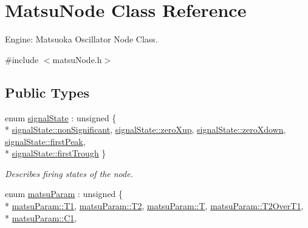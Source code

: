 \hypertarget{classMatsuNode}{}\section{Matsu\+Node Class Reference}
\label{classMatsuNode}


Engine\+: Matsuoka Oscillator Node Class.  




{\ttfamily \#include $<$matsu\+Node.\+h$>$}

\subsection*{Public Types}
\begin{DoxyCompactItemize}
\item 
enum \hyperlink{classMatsuNode_abd587a4a72c6774f689d21c78a8bc239}{signal\+State} \+: unsigned \{ \\*
\hyperlink{classMatsuNode_abd587a4a72c6774f689d21c78a8bc239a0bb1b43452dec8bd11b5e9890a7f7450}{signal\+State\+::non\+Significant}, 
\hyperlink{classMatsuNode_abd587a4a72c6774f689d21c78a8bc239a3f079b68569f500bc365cf6513c49faf}{signal\+State\+::zero\+Xup}, 
\hyperlink{classMatsuNode_abd587a4a72c6774f689d21c78a8bc239a407fa5b9f845d5588e6c327b02619574}{signal\+State\+::zero\+Xdown}, 
\hyperlink{classMatsuNode_abd587a4a72c6774f689d21c78a8bc239a29d72117a1b778320c35281a36df8c3b}{signal\+State\+::first\+Peak}, 
\\*
\hyperlink{classMatsuNode_abd587a4a72c6774f689d21c78a8bc239a9c831b3d9b2ac846c1900fca753db49a}{signal\+State\+::first\+Trough}
 \}\begin{DoxyCompactList}\small\item\em Describes firing states of the node. \end{DoxyCompactList}
\item 
enum \hyperlink{classMatsuNode_aed801e1d0363292efc99bb02f1911386}{matsu\+Param} \+: unsigned \{ \\*
\hyperlink{classMatsuNode_aed801e1d0363292efc99bb02f1911386ace499dea30cfce118f4fe85da0227e83}{matsu\+Param\+::\+T1}, 
\hyperlink{classMatsuNode_aed801e1d0363292efc99bb02f1911386a71d2c46af01feeea54a0f541243e297b}{matsu\+Param\+::\+T2}, 
\hyperlink{classMatsuNode_aed801e1d0363292efc99bb02f1911386ab9ece18c950afbfa6b0fdbfa4ff731d3}{matsu\+Param\+::T}, 
\hyperlink{classMatsuNode_aed801e1d0363292efc99bb02f1911386a082a8ec4c12853282b09b34982d82a23}{matsu\+Param\+::\+T2\+Over\+T1}, 
\\*
\hyperlink{classMatsuNode_aed801e1d0363292efc99bb02f1911386a1a2ddc2db4693cfd16d534cde5572cc1}{matsu\+Param\+::\+C1}, 

\end{DoxyCompactItemize}
